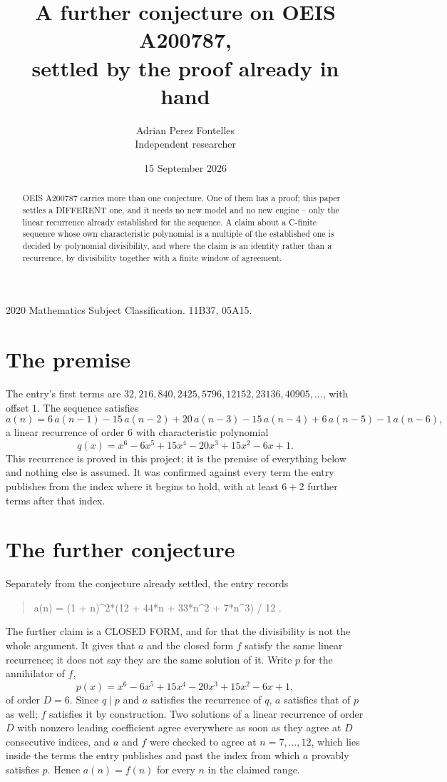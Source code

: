 \documentclass[11pt,a4paper]{article}
\title{A further conjecture on OEIS A200787,\\ \large settled by the proof already in hand}
\author{Adrian Perez Fontelles\\ \small Independent researcher}
\date{15 September 2026}
\theoremstyle{plain}
\theoremstyle{definition}
\begin{document}
\maketitle

\begin{abstract}
OEIS A200787 carries more than one conjecture. One of them has a proof; this paper settles a
DIFFERENT one, and it needs no new model and no new engine -- only the linear recurrence already
established for the sequence. A claim about a C-finite sequence whose own characteristic
polynomial is a multiple of the established one is decided by polynomial divisibility, and where
the claim is an identity rather than a recurrence, by divisibility together with a finite window
of agreement.
\end{abstract}

\noindent\small 2020 Mathematics Subject Classification. 11B37, 05A15.\normalsize

\section{The premise}

The entry's first terms are $32, 216, 840, 2425, 5796, 12152, 23136, 40905,\dots$, with offset $1$. The sequence satisfies
\[
  a(n)=6\,a(n-1) - 15\,a(n-2) + 20\,a(n-3) - 15\,a(n-4) + 6\,a(n-5) - 1\,a(n-6) ,
\]
a linear recurrence of order $6$ with characteristic polynomial
\[
  q(x)=x^{6} - 6 x^{5} + 15 x^{4} - 20 x^{3} + 15 x^{2} - 6 x + 1 .
\]
This recurrence is proved in this project; it is the premise of everything below and nothing else is assumed.
It was confirmed against every term the entry publishes from the index where it begins to hold,
with at least $6+2$ further terms after that index.

\section{The further conjecture}

Separately from the conjecture already settled, the entry records

\begin{quote}\raggedright a(n) = (1 + n)\^{}2*(12 + 44*n + 33*n\^{}2 + 7*n\^{}3) / 12 .\end{quote}

The further claim is a CLOSED FORM, and for that the divisibility is not the whole argument. It
gives that $a$ and the closed form $f$ satisfy the same linear recurrence; it does not say they
are the same solution of it. Write $p$ for the annihilator of $f$,
\[
  p(x)=x^{6} - 6 x^{5} + 15 x^{4} - 20 x^{3} + 15 x^{2} - 6 x + 1 ,
\]
of order $D=6$. Since $q\mid p$ and $a$ satisfies the recurrence of $q$, $a$ satisfies that of
$p$ as well; $f$ satisfies it by construction. Two solutions of a linear recurrence of order $D$
with nonzero leading coefficient agree everywhere as soon as they agree at $D$ consecutive
indices, and $a$ and $f$ were checked to agree at $n=7,\dots,12$,
which lies inside the terms the entry publishes and past the index from which $a$ provably
satisfies $p$. Hence $a(n)=f(n)$ for every $n$ in the claimed range.
\end{document}
